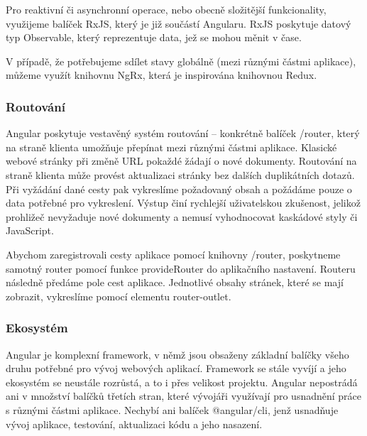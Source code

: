 Pro reaktivní či asynchronní operace, nebo obecně složitější funkcionality, využijeme balíček RxJS, který je již součástí Angularu. 
RxJS poskytuje datový typ Observable, který reprezentuje data, jež se mohou měnit v čase.\cite{angulario,rxjslibrary}

V případě, že potřebujeme sdílet stavy globálně (mezi různými částmi aplikace), můžeme využít knihovnu NgRx, která je inspirována knihovnou Redux.\cite{angularstatemanagement,ngrxlib}

\subsubsection{Routování}

Angular poskytuje vestavěný systém routování -- konkrétně balíček \@angular/router, který na straně klienta umožňuje přepínat mezi různými částmi aplikace. 
Klasické webové stránky při změně URL pokaždé žádají o nové dokumenty. Routování na straně klienta může provést aktualizaci stránky bez dalších duplikátních dotazů. 
Při vyžádání dané cesty pak vykreslíme požadovaný obsah a požádáme pouze o data potřebné pro vykreslení. 
Výstup činí rychlejší uživatelskou zkušenost, jelikož prohližeč nevyžaduje nové dokumenty a nemusí vyhodnocovat kaskádové styly či JavaScript.

Abychom zaregistrovali cesty aplikace pomocí knihovny \@angular/router, poskytneme samotný router pomocí funkce provideRouter do aplikačního nastavení. 
Routeru následně předáme pole cest aplikace. Jednotlivé obsahy stránek, které se mají zobrazit, vykreslíme pomocí elementu router-outlet.\cite{angulardev,learningangular}

\subsubsection{Ekosystém}

Angular je komplexní framework, v němž jsou obsaženy základní balíčky všeho druhu potřebné pro vývoj webových aplikací. 
Framework se stále vyvíjí a jeho ekosystém se neustále rozrůstá, a to i přes velikost projektu. 
Angular nepostrádá ani v množství balíčků třetích stran, které vývojáři využívají pro usnadnění práce s různými částmi aplikace. 
Nechybí ani balíček @angular/cli, jenž usnadňuje vývoj aplikace, testování, aktualizaci kódu a jeho nasazení.\cite{angulardev,learningangular}